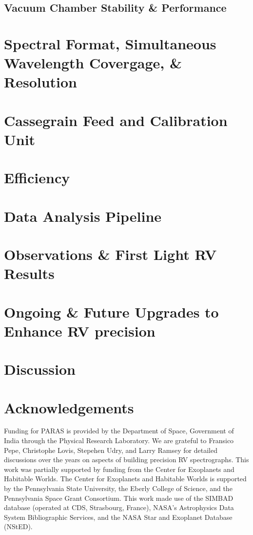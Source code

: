 \documentclass[12pt,preprint]{emulateapj}
\begin{document}
\subsection{Vacuum Chamber Stability \& Performance}
\section{Spectral Format, Simultaneous Wavelength Covergage, \& Resolution}
\section{Cassegrain Feed and Calibration Unit}
\section{Efficiency}
\section{Data Analysis Pipeline}
\section{Observations \& First Light RV Results}
\section{Ongoing \& Future Upgrades to Enhance RV precision}
\section{Discussion}

\section*{Acknowledgements}
Funding for PARAS is provided by the Department of Space, Government of India through the Physical Research Laboratory.
We are grateful to Fransico Pepe, Christophe Lovis, Stepehen Udry, and Larry Ramsey for detailed discussions over the years on aspects of building precision RV spectrographs.
This work was partially supported by funding from the Center for Exoplanets and Habitable Worlds. The
Center for Exoplanets and Habitable Worlds is supported by the
Pennsylvania State University, the Eberly College of Science, and the
Pennsylvania Space Grant Consortium.  This work made use of the
SIMBAD database (operated at CDS, Strasbourg, France), NASA's
Astrophysics Data System Bibliographic Services, and the NASA Star and
Exoplanet Database (NStED).


\begin{thebibliography}{}


\end{thebibliography}
\end{document}
